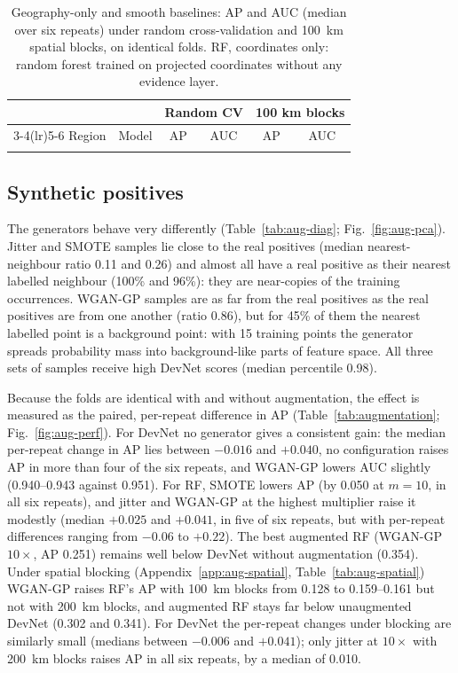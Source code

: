 \documentclass[pdflatex,sn-apa]{sn-jnl}
\begin{document}
\begin{table}[t]
\caption{Geography-only and smooth baselines: AP and AUC (median over six repeats) under random cross-validation and 100~km spatial blocks, on identical folds. RF, coordinates only: random forest trained on projected coordinates without any evidence layer.}\label{tab:geography}
\footnotesize
\setlength{\tabcolsep}{3pt}
\begin{tabular*}{\textwidth}{@{\extracolsep\fill}llcccc}
\toprule
 & & \multicolumn{2}{c}{Random CV} & \multicolumn{2}{c}{100 km blocks} \\
\cmidrule(lr){3-4}\cmidrule(lr){5-6}
Region & Model & AP & AUC & AP & AUC \\
\midrule
\botrule
\end{tabular*}
\end{table}

\subsection{Synthetic positives}\label{sec:res-augmentation}

The generators behave very differently (Table~\ref{tab:aug-diag}; Fig.~\ref{fig:aug-pca}). Jitter and SMOTE samples lie close to the real positives (median nearest-neighbour ratio 0.11 and 0.26) and almost all have a real positive as their nearest labelled neighbour (100\% and 96\%): they are near-copies of the training occurrences. WGAN-GP samples are as far from the real positives as the real positives are from one another (ratio 0.86), but for 45\% of them the nearest labelled point is a background point: with 15 training points the generator spreads probability mass into background-like parts of feature space. All three sets of samples receive high DevNet scores (median percentile 0.98).

Because the folds are identical with and without augmentation, the effect is measured as the paired, per-repeat difference in AP (Table~\ref{tab:augmentation}; Fig.~\ref{fig:aug-perf}). For DevNet no generator gives a consistent gain: the median per-repeat change in AP lies between $-0.016$ and $+0.040$, no configuration raises AP in more than four of the six repeats, and WGAN-GP lowers AUC slightly (0.940--0.943 against 0.951). For RF, SMOTE lowers AP (by 0.050 at $m = 10$, in all six repeats), and jitter and WGAN-GP at the highest multiplier raise it modestly (median $+0.025$ and $+0.041$, in five of six repeats, but with per-repeat differences ranging from $-0.06$ to $+0.22$). The best augmented RF (WGAN-GP $10\times$, AP 0.251) remains well below DevNet without augmentation (0.354). Under spatial blocking (Appendix~\ref{app:aug-spatial}, Table~\ref{tab:aug-spatial}) WGAN-GP raises RF's AP with 100~km blocks from 0.128 to 0.159--0.161 but not with 200~km blocks, and augmented RF stays far below unaugmented DevNet (0.302 and 0.341). For DevNet the per-repeat changes under blocking are similarly small (medians between $-0.006$ and $+0.041$); only jitter at $10\times$ with 200~km blocks raises AP in all six repeats, by a median of 0.010.
\end{document}
